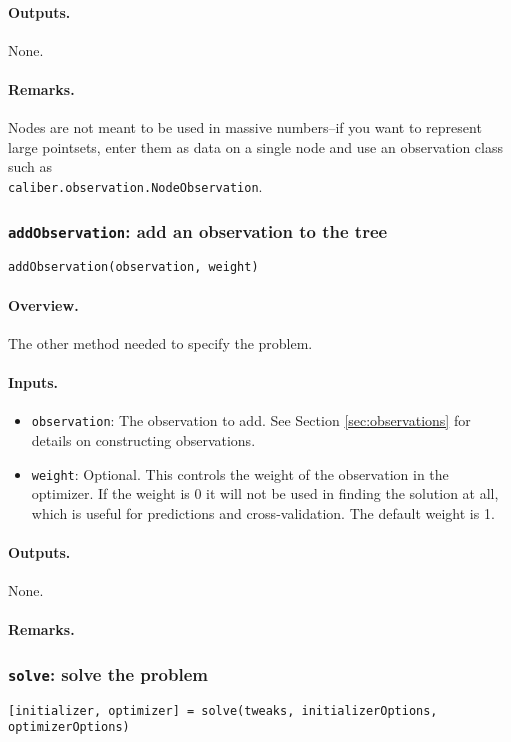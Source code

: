\paragraph{Outputs.}
None.
\paragraph{Remarks.}
Nodes are not meant to be used in massive numbers--if you want to represent large pointsets, 
enter them as data on a single node and use an observation class such as \\ \texttt{caliber.observation.NodeObservation}.

\subsubsection{\texttt{addObservation}: add an observation to the tree}
\texttt{addObservation(observation, weight)}
\paragraph{Overview.} The other method needed to specify the problem.
\paragraph{Inputs.}
\begin{itemize}
	\item \texttt{observation}: The observation to add. See Section \ref{sec:observations} for details on constructing observations.
	\item \texttt{weight}: Optional. This controls the weight of the observation
		in the optimizer. If the weight is 0 it will not be used in finding the solution at all,
		which is useful for predictions and cross-validation. The default weight is 1.
\end{itemize}
\paragraph{Outputs.} None.
\paragraph{Remarks.}

\subsubsection{\texttt{solve}: solve the problem}
\texttt{[initializer, optimizer] = solve(tweaks, initializerOptions, optimizerOptions)}
